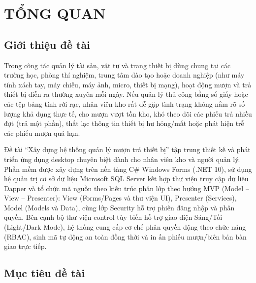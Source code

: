 \chapter{TỔNG QUAN}

\section{Giới thiệu đề tài}

Trong công tác quản lý tài sản, vật tư và trang thiết bị dùng chung tại các trường học, phòng thí nghiệm, trung tâm đào tạo hoặc doanh nghiệp (như máy tính xách tay, máy chiếu, máy ảnh, micro, thiết bị mạng), hoạt động mượn và trả thiết bị diễn ra thường xuyên mỗi ngày. Nếu quản lý thủ công bằng sổ giấy hoặc các tệp bảng tính rời rạc, nhân viên kho rất dễ gặp tình trạng không nắm rõ số lượng khả dụng thực tế, cho mượn vượt tồn kho, khó theo dõi các phiếu trả nhiều đợt (trả một phần), thất lạc thông tin thiết bị hư hỏng/mất hoặc phát hiện trễ các phiếu mượn quá hạn.


Đề tài “Xây dựng hệ thống quản lý mượn trả thiết bị” tập trung thiết kế và phát triển ứng dụng desktop chuyên biệt dành cho nhân viên kho và người quản lý. Phần mềm được xây dựng trên nền tảng C\# Windows Forms (.NET 10), sử dụng hệ quản trị cơ sở dữ liệu Microsoft SQL Server kết hợp thư viện truy cập dữ liệu Dapper và tổ chức mã nguồn theo kiến trúc phân lớp theo hướng MVP (Model – View – Presenter): View (Forms/Pages và thư viện UI), Presenter (Services), Model (Models và Data), cùng lớp Security hỗ trợ phiên đăng nhập và phân quyền. Bên cạnh bộ thư viện control tùy biến  hỗ trợ giao diện Sáng/Tối (Light/Dark Mode), hệ thống cung cấp cơ chế phân quyền động theo chức năng (RBAC), sinh mã tự động an toàn đồng thời và in ấn phiếu mượn/biên bản bàn giao trực tiếp.


\section{Mục tiêu đề tài}

